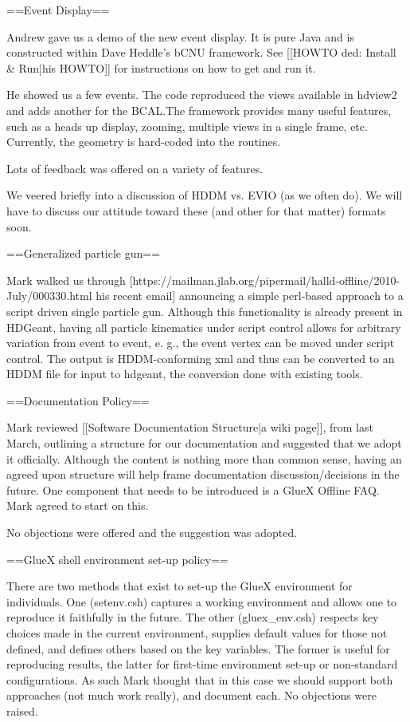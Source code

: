 ==Event Display==

Andrew gave us a demo of the new event display. It is pure Java and is constructed within Dave Heddle's bCNU framework. See [[HOWTO ded: Install & Run|his HOWTO]] for instructions on how to get and run it.

He showed us a few events. The code reproduced the views available in hdview2 and adds another for the BCAL.The framework provides many useful features, such as a heads up display, zooming, multiple views in a single frame, etc. Currently, the geometry is hard-coded into the routines.

Lots of feedback was offered on a variety of features.

We veered briefly into a discussion of HDDM vs. EVIO (as we often do). We will have to discuss our attitude toward these (and other for that matter) formats soon.

==Generalized particle gun==

Mark walked us through [https://mailman.jlab.org/pipermail/halld-offline/2010-July/000330.html his recent email] announcing a simple perl-based approach to a script driven single particle gun. Although this functionality is already present in HDGeant, having all particle kinematics under script control allows for arbitrary variation from event to event, e. g., the event vertex can be moved under script control. The output is HDDM-conforming xml and thus can be converted to an HDDM file for input to hdgeant, the conversion done with existing tools.

==Documentation Policy==

Mark reviewed [[Software Documentation Structure|a wiki page]], from last March, outlining a structure for our documentation and suggested that we adopt it officially. Although the content is nothing more than common sense, having an agreed upon structure will help frame documentation discussion/decisions in the future. One component that needs to be introduced is a GlueX Offline FAQ. Mark agreed to start on this.

No objections were offered and the suggestion was adopted.

==GlueX shell environment set-up policy==

There are two methods that exist to set-up the GlueX environment for individuals. One (setenv.csh) captures a working environment and allows one to reproduce it faithfully in the future. The other (gluex_env.csh) respects key choices made in the current environment, supplies default values for those not defined, and defines others based on the key variables. The former is useful for reproducing results, the latter for first-time environment set-up or non-standard configurations. As such Mark thought that in this case we should support both approaches (not much work really), and document each. No objections were raised.

